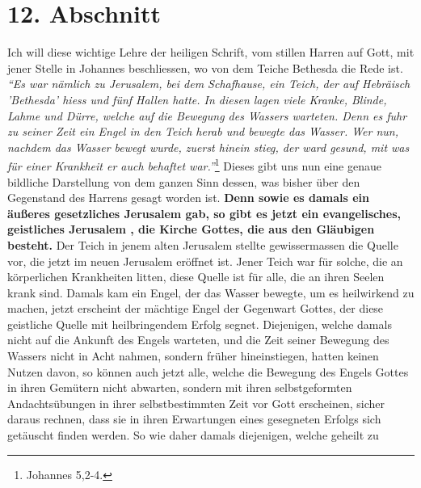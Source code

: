 \section{12. Abschnitt} \label{kap6_ab12}

\label{ref:06_12_wahre_kirche}
Ich will diese wichtige Lehre der heiligen Schrift, vom stillen Harren auf Gott,
mit jener Stelle in Johannes beschliessen, wo von dem Teiche Bethesda
die Rede ist.
\textit{"`Es war nämlich zu Jerusalem, bei dem Schafhause, ein Teich, der
auf Hebräisch 'Bethesda' hiess und fünf Hallen hatte. In diesen lagen viele
Kranke, Blinde, Lahme und Dürre, welche auf die Bewegung des Wassers warteten.
Denn es fuhr zu seiner Zeit ein Engel in den Teich herab und bewegte das
Wasser. Wer nun, nachdem das Wasser bewegt wurde, zuerst hinein stieg, der ward
gesund, mit was für einer Krankheit er auch behaftet war."'}\footnote{Johannes
5,2-4.}
Dieses gibt uns nun eine genaue bildliche Darstellung von dem ganzen Sinn
dessen, was bisher über den Gegenstand des Harrens gesagt worden ist.
\textbf{Denn sowie
es damals ein äußeres gesetzliches Jerusalem
gab, so gibt es jetzt ein
evangelisches, geistliches Jerusalem
, die Kirche Gottes, die aus
den Gläubigen
besteht.} Der Teich in jenem alten Jerusalem
stellte gewissermassen die Quelle
vor, die jetzt im neuen Jerusalem eröffnet ist.
Jener Teich war für solche, die
an körperlichen Krankheiten litten, diese Quelle ist für alle, die an ihren
Seelen krank sind. Damals kam ein Engel, der das Wasser bewegte, um es
heilwirkend zu machen, jetzt erscheint der mächtige Engel
 der
Gegenwart Gottes,
der diese geistliche Quelle mit heilbringendem Erfolg
segnet. Diejenigen,
welche damals nicht auf die Ankunft des Engels warteten, und die Zeit seiner
Bewegung des Wassers nicht in Acht nahmen, sondern früher hineinstiegen, hatten
keinen Nutzen davon, so können auch jetzt alle, welche die Bewegung des Engels
Gottes in ihren Gemütern nicht abwarten, sondern mit ihren selbstgeformten
Andachtsübungen in ihrer selbstbestimmten Zeit vor Gott erscheinen, sicher
daraus rechnen, dass sie in ihren Erwartungen eines gesegneten Erfolgs sich
getäuscht finden werden. So wie daher damals diejenigen, welche geheilt zu
